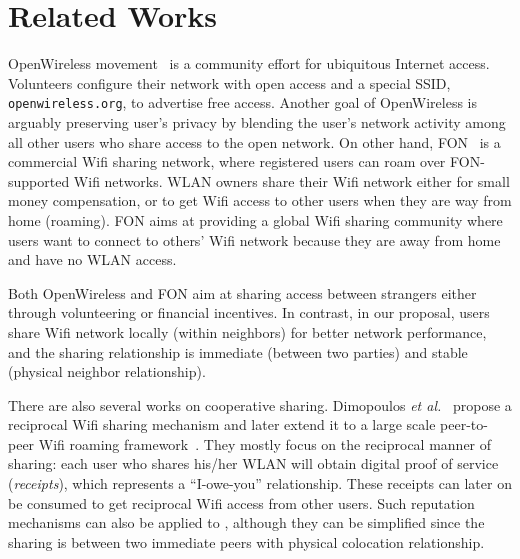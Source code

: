 \section{Related Works}
\label{sec:related}

OpenWireless movement~\cite{openwireless} is a community effort for ubiquitous
Internet access. Volunteers configure their
\wifi{} network with open access and a special SSID, \texttt{openwireless.org},
to advertise free access. Another goal of OpenWireless is arguably preserving
user's privacy by blending the user's network activity among all other users who
share access to the open \wifi{} network. On other hand, FON~\cite{fon} is a
commercial Wifi sharing network, where registered users can roam over
FON-supported Wifi networks. WLAN owners share their Wifi network either for
small money compensation, or to get Wifi access to other users when they are way
from home (roaming). FON aims at providing a global Wifi sharing community where
users want to connect to others' Wifi network because they are away from home and
have no WLAN access. 

Both OpenWireless and FON aim at sharing \wifi{} access between strangers either
through volunteering or financial incentives. In contrast, in our proposal, users share
Wifi network locally (within neighbors) for better network performance, and the
sharing relationship is immediate (between two parties) and stable (physical
neighbor relationship).

There are also several works on cooperative \wifi{} sharing. Dimopoulos
\textit{et al.}~\cite{efstathiou2010controlled} propose a reciprocal Wifi
sharing mechanism and later extend it to a large scale peer-to-peer Wifi
roaming framework~\cite{dimopoulos2010exploiting}. They mostly focus on the
reciprocal manner of sharing: each user who shares his/her WLAN will obtain
digital proof of service (\textit{receipts}), which represents a ``I-owe-you''
relationship. These receipts can later on be consumed to get reciprocal Wifi
access from other users. Such reputation mechanisms can also be applied to
\wisefi{}, although they can be simplified since the sharing is between two
immediate peers with physical colocation relationship.
